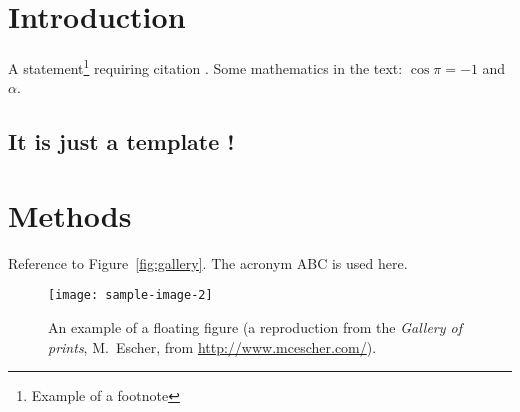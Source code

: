 \documentclass[12pt]{article} 				%
\begin{document}




\thispagestyle{empty}

\tableofcontents

\listoffigures
 
\listoftables



\clearpage
 


\normalfont 


\section{Introduction} \label{section:introduction}
\lipsum[2-3]

A statement\footnote{Example of a footnote} requiring citation \cite{Figueredo:2009dg}. 
Some mathematics in the text: $\cos\pi=-1$ and $\alpha$.

\subsection{It is just a template !} \label{subsection:intro-subsection}
\lipsum[20]

\section{Methods} \label{section:methods}
Reference to Figure~\vref{fig:gallery}. %
The acronym \ac{ABC} is used here. 

\begin{figure}[tb]
\centering 
\texttt{[image: sample-image-2]} 
\caption[An example of a floating figure]{An example of a floating figure (a reproduction from the \emph{Gallery of prints}, M.~Escher, from \url{http://www.mcescher.com/}).} 
\label{fig:gallery} 
\end{figure}
\end{document}
